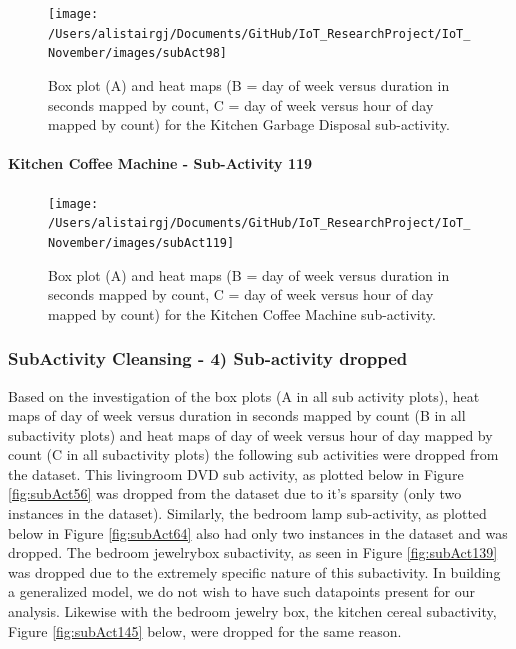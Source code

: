 \documentclass[11pt,]{article}
\let\oldparagraph\paragraph
\renewcommand{\paragraph}[1]{\oldparagraph{#1}\mbox{}}
\begin{document}
\begin{figure}[H]

{\centering \texttt{[image: /Users/alistairgj/Documents/GitHub/IoT\_ResearchProject/IoT\_November/images/subAct98]} 

}

\caption{Box plot (A) and heat maps (B = day of week versus duration in seconds mapped by count, C = day of week versus hour of day mapped by count) for the Kitchen Garbage Disposal sub-activity.}\label{fig:subAct98}
\end{figure}

\hypertarget{kitchen-coffee-machine---sub-activity-119}{%
\paragraph{Kitchen Coffee Machine - Sub-Activity
119}\label{kitchen-coffee-machine---sub-activity-119}}

\begin{figure}[H]

{\centering \texttt{[image: /Users/alistairgj/Documents/GitHub/IoT\_ResearchProject/IoT\_November/images/subAct119]} 

}

\caption{Box plot (A) and heat maps (B = day of week versus duration in seconds mapped by count, C = day of week versus hour of day mapped by count) for the Kitchen Coffee Machine sub-activity.}\label{fig:subAct119}
\end{figure}

\hypertarget{subactivity-cleansing---4-sub-activity-dropped}{%
\subsubsection{SubActivity Cleansing - 4) Sub-activity
dropped}\label{subactivity-cleansing---4-sub-activity-dropped}}

Based on the investigation of the box plots (A in all sub activity
plots), heat maps of day of week versus duration in seconds mapped by
count (B in all subactivity plots) and heat maps of day of week versus
hour of day mapped by count (C in all subactivity plots) the following
sub activities were dropped from the dataset. This livingroom DVD sub
activity, as plotted below in Figure \ref{fig:subAct56} was dropped from
the dataset due to it's sparsity (only two instances in the dataset).
Similarly, the bedroom lamp sub-activity, as plotted below in Figure
\ref{fig:subAct64} also had only two instances in the dataset and was
dropped. The bedroom jewelrybox subactivity, as seen in Figure
\ref{fig:subAct139} was dropped due to the extremely specific nature of
this subactivity. In building a generalized model, we do not wish to
have such datapoints present for our analysis. Likewise with the bedroom
jewelry box, the kitchen cereal subactivity, Figure \ref{fig:subAct145}
below, were dropped for the same reason.
\end{document}
